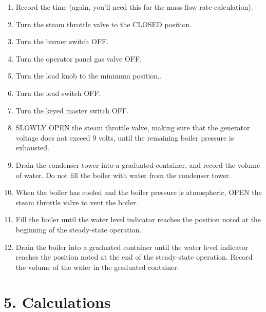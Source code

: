 \documentclass[12pt]{article}
\begin{document}
\begin{enumerate}

\item Record the time (again, you'll need this for the mass flow rate calculation).

\item Turn the steam throttle valve to the CLOSED position.

\item Turn the burner switch OFF.

\item Turn the operator panel gas valve OFF.

\item Turn the load knob to the minimum position,.

\item Turn the load switch OFF.

\item Turn the keyed master switch OFF.

\item SLOWLY OPEN the steam throttle valve, making sure that
the generator voltage does not exceed 9 volts, until the
remaining boiler pressure is exhausted.

\item Drain the condenser tower into a graduated container, and record
the volume of water.  Do not fill the boiler with water from the
condenser tower.

\item When the boiler has cooled and the boiler pressure is
atmospheric, OPEN the steam throttle valve to vent the boiler.

\item Fill the boiler until the water level indicator reaches 
the position noted at the beginning of the steady-state operation.

\item Drain the boiler into a graduated container until the 
water level indicator reaches the position noted at the end
of the steady-state operation.  Record the volume of the
water in the graduated container.

\end{enumerate}

\section*{\normalsize \bf 5. Calculations}
\end{document}
